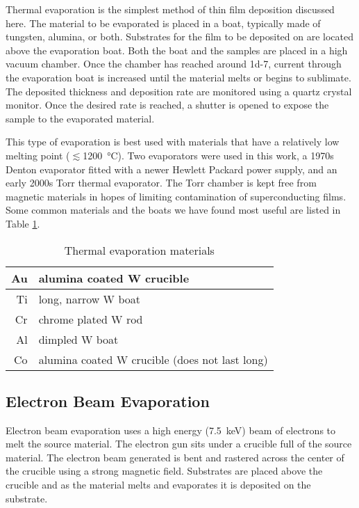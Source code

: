 Thermal evaporation is the simplest method of thin film deposition discussed here. The material to be evaporated is placed in a boat, typically made of tungsten, alumina, or both. Substrates for the film to be deposited on are located above the evaporation boat. Both the boat and the samples are placed in a high vacuum chamber. Once the chamber has reached around \SI{1d-7}{\torr}, current through the evaporation boat is increased until the material melts or begins to sublimate. The deposited thickness and deposition rate are monitored using a quartz crystal monitor. Once the desired rate is reached, a shutter is opened to expose the sample to the evaporated material. 

This type of evaporation is best used with materials that have a relatively low melting point ($\lesssim$\SI{1200}{\degreeCelsius}). Two evaporators were used in this work, a 1970s Denton evaporator fitted with a newer Hewlett Packard power supply, and an early 2000s Torr thermal evaporator. The Torr chamber is kept free from magnetic materials in hopes of limiting contamination of superconducting films. Some common materials and the boats we have found most useful are listed in Table \ref{table:thermal_evap}.

\begin{table}
	\centering
	\caption{Thermal evaporation materials}
	\begin{tabular}{r | p{60mm}}
		\hline
		Au & alumina coated W crucible \\ \hline
		Ti & long, narrow W boat \\ \hline
		Cr & chrome plated W rod\\ \hline
		Al & dimpled W boat \\ \hline
		Co & alumina coated W crucible (does not last long) \\ \hline
	\end{tabular}
	\label{table:thermal_evap}
\end{table}	

\subsection{Electron Beam Evaporation}
\label{subsec:ebeam_evap}

Electron beam evaporation uses a high energy (\SI{7.5}{\kilo\electronvolt}) beam of electrons to melt the source material. The electron gun sits under a crucible full of the source material. The electron beam generated is bent and rastered across the center of the crucible using a strong magnetic field. Substrates are placed above the crucible and as the material melts and evaporates it is deposited on the substrate.

